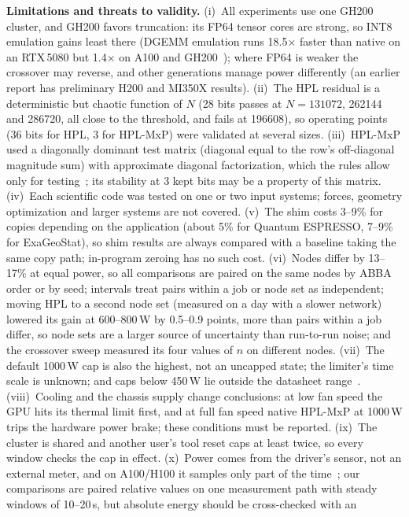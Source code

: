 \documentclass[conference]{IEEEtran}
\newcommand{\W}{\,W}
\newcommand{\pct}{\%}
\begin{document}
\textbf{Limitations and threats to validity.} (i)~All experiments use one GH200 cluster, and GH200 favors truncation: its FP64
tensor cores are strong, so INT8 emulation gains least there (DGEMM emulation runs 18.5$\times$ faster than native on an
RTX\,5080 but 1.4$\times$ on A100 and GH200~\cite{Uchino2025}); where FP64 is weaker the crossover may reverse, and
other generations manage power differently (an earlier report has preliminary H200 and MI350X results). (ii)~The HPL residual is a deterministic but
chaotic function of $N$ (28 bits passes at $N=131072$, 262144 and 286720, all close to the threshold, and fails at
196608), so operating points (36 bits for HPL, 3 for HPL-MxP) were validated at several sizes. (iii)~HPL-MxP used a diagonally dominant test
matrix (diagonal equal to the row's off-diagonal magnitude sum) with approximate diagonal factorization, which the rules allow only for testing~\cite{HPLMxPRules}; its
stability at 3 kept bits may be a property of this matrix. (iv)~Each scientific code was tested on one or two input
systems; forces, geometry optimization and larger systems are not covered. (v)~The shim costs 3--9\pct{} for copies
depending on the application (about 5\pct{} for Quantum ESPRESSO, 7--9\pct{} for ExaGeoStat), so shim results are
always compared with a baseline taking the same copy path; in-program zeroing has no such cost. (vi)~Nodes differ by
13--17\pct{} at equal power, so all comparisons are paired on the same nodes by ABBA order or by seed; intervals treat
pairs within a job or node set as independent; moving HPL to a second node set (measured on a day with a slower
network) lowered its gain at 600--800\W{} by 0.5--0.9 points, more than pairs within a job differ, so node sets are
a larger source of uncertainty than run-to-run noise; and the crossover sweep measured its four values of $n$ on
different nodes. (vii)~The default 1000\W{} cap is also the
highest, not an uncapped state; the limiter's time scale is unknown; and caps below 450\W{} lie outside the
datasheet range~\cite{NVIDIAGH200}. (viii)~Cooling and the chassis supply change conclusions: at low
fan speed the GPU hits its thermal limit first, and at full fan speed native HPL-MxP at 1000\W{} trips the hardware
power brake; these conditions must be reported. (ix)~The cluster is shared and another user's tool reset caps at
least twice, so every window checks the cap in effect. (x)~Power comes from the driver's sensor, not an external
meter, and on A100/H100 it samples only part of the time~\cite{Yang2024}; our comparisons are paired relative values
on one measurement path with steady windows of 10--20\,s, but absolute energy should be cross-checked with an
\end{document}
